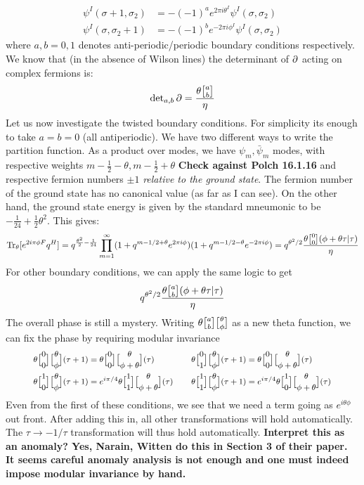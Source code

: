 \documentclass[11pt, class=article, crop=false]{standalone}
\begin{document}
\begin{enumerate}
		\[
		\begin{aligned}
			\psi^I (\sigma + 1, \sigma_2) &= -(-1)^{a} e^{2 \pi i \theta^I} \psi^I (\sigma, \sigma_2) \\
			\psi^I (\sigma, \sigma_2 + 1) &= -(-1)^{b} e^{-2\pi i \phi^I} \psi^I (\sigma, \sigma_2)
		\end{aligned}
		\]
		where $a,b = 0,1$ denotes anti-periodic/periodic boundary conditions respectively. We know that (in the absence of Wilson lines) the determinant of $\partial$ acting on complex fermions is:
		\[
			\text{det}_{a,b}\, \d = \frac{\theta \twist{a}{b}}{\eta}
		\]
		Let us now investigate the twisted boundary conditions. For simplicity its enough to take $a= b = 0$ (all antiperiodic). We have two different ways to write the partition function. As a product over modes, we have $\psi_m, \bar \psi_m$ modes, with respective weights $m-\frac12 -\theta, m-\frac12+\theta$ \textbf{Check against Polch 16.1.16} and respective fermion numbers $\pm1$ \emph{relative to the ground state}. The fermion number of the ground state has no canonical value (as far as I can see). On the other hand, the ground state energy is given by the standard mneumonic to be $-\frac{1}{24} + \frac12 \theta^2$. This gives:
		\[
			\Tr_{\theta} [e^{2 i \pi \phi F} q^{H}] = q^{\frac{\theta^2}{2} - \frac{1}{24}} \prod_{m=1}^\infty (1 + q^{m -1/2 + \theta} e^{2\pi i \phi}) (1 + q^{m -1/2 - \theta} e^{-2\pi i \phi}) = q^{\theta^2/2}\frac{\theta\twist00 (\phi + \theta \tau | \tau)}{\eta}
		\]
		For other boundary conditions, we can apply the same logic to get 
		\[
			q^{\theta^2/2} \frac{\theta \twist a b (\phi + \theta \tau | \tau)}{\eta}
		\]
		The overall phase is still a mystery. Writing $\theta \twist a b \twist \theta \phi$ as a new theta function, we can fix the phase by requiring modular invariance 
		\begin{equation}\label{eq:thetaproperties}
			\footnotesize
		\begin{aligned}
			\theta \twist 0 0 \twist \theta \phi (\tau+1) &= \theta \twist 0 0 \twist{\theta}{\phi+\theta} (\tau)
			&\quad&
			 \theta \twist 0 1 \twist \theta \phi (\tau+1) = \theta \twist 0 0 \twist{\theta}{\phi+\theta}(\tau)\\
			 \theta \twist10 \twist \theta \phi (\tau+1) &= e^{i \pi /4} \theta \twist11 \twist{\theta}{\phi+\theta}(\tau)
			 &\quad&
			 \theta \twist11 \twist \theta \phi (\tau+1) = e^{i\pi/4} \theta \twist10 \twist{\theta}{\phi+\theta}(\tau)
		\end{aligned}
		\end{equation}
		Even from the first of these conditions, we see that we need a term going as $e^{i \theta \phi}$ out front. After adding this in, all other transformations will hold automatically. The $\tau \to -1/\tau$ transformation will thus hold automatically. \textbf{Interpret this as an anomaly? Yes, Narain, Witten do this in Section 3 of their paper. It seems careful anomaly analysis is not enough and one must indeed impose modular invariance by hand.} 
		

\end{enumerate}
\end{document}
